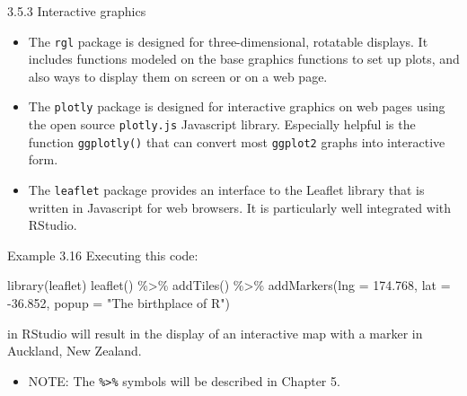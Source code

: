 \documentclass[
  9pt,
  a4paper,
  ignorenonframetext,
  notheorems]{beamer}
\newenvironment{Shaded}{\begin{snugshade}}{\end{snugshade}}
\newcommand{\AttributeTok}[1]{\textcolor[rgb]{0.40,0.45,0.13}{#1}}
\newcommand{\FloatTok}[1]{\textcolor[rgb]{0.68,0.00,0.00}{#1}}
\newcommand{\FunctionTok}[1]{\textcolor[rgb]{0.28,0.35,0.67}{#1}}
\newcommand{\NormalTok}[1]{\textcolor[rgb]{0.00,0.23,0.31}{#1}}
\newcommand{\SpecialCharTok}[1]{\textcolor[rgb]{0.37,0.37,0.37}{#1}}
\newcommand{\StringTok}[1]{\textcolor[rgb]{0.13,0.47,0.30}{#1}}
\providecommand{\tightlist}{%
  \setlength{\itemsep}{0pt}\setlength{\parskip}{0pt}}\usepackage{longtable,booktabs,array}
\begin{document}
\begin{frame}[fragile]
\begin{block}{3.5.3 Interactive graphics}
\protect\hypertarget{interactive-graphics}{}
\begin{itemize}
\item
  The \texttt{rgl} package is designed for three-dimensional, rotatable
  displays. It includes functions modeled on the base graphics functions
  to set up plots, and also ways to display them on screen or on a web
  page.
\item
  The \texttt{plotly} package is designed for interactive graphics on
  web pages using the open source \texttt{plotly.js} Javascript library.
  Especially helpful is the function \texttt{ggplotly()} that can
  convert most \texttt{ggplot2} graphs into interactive form.
\item
  The \texttt{leaflet} package provides an interface to the Leaflet
  library that is written in Javascript for web browsers. It is
  particularly well integrated with RStudio.
\end{itemize}
\end{block}

\begin{block}{Example 3.16}
\protect\hypertarget{example-3.16}{}
Executing this code:

\begin{Shaded}
\begin{Highlighting}[]
\FunctionTok{library}\NormalTok{(leaflet) }
\FunctionTok{leaflet}\NormalTok{() }\SpecialCharTok{\%\textgreater{}\%}
  \FunctionTok{addTiles}\NormalTok{() }\SpecialCharTok{\%\textgreater{}\%}
  \FunctionTok{addMarkers}\NormalTok{(}\AttributeTok{lng =} \FloatTok{174.768}\NormalTok{, }\AttributeTok{lat =} \SpecialCharTok{{-}}\FloatTok{36.852}\NormalTok{, }\AttributeTok{popup =} \StringTok{"The birthplace of R"}\NormalTok{)}
\end{Highlighting}
\end{Shaded}

in RStudio will result in the display of an interactive map with a
marker in Auckland, New Zealand.

\begin{itemize}
\tightlist
\item
  NOTE: The \texttt{\%\textgreater{}\%} symbols will be described in
  Chapter 5.
\end{itemize}
\end{block}
\end{frame}
\end{document}
